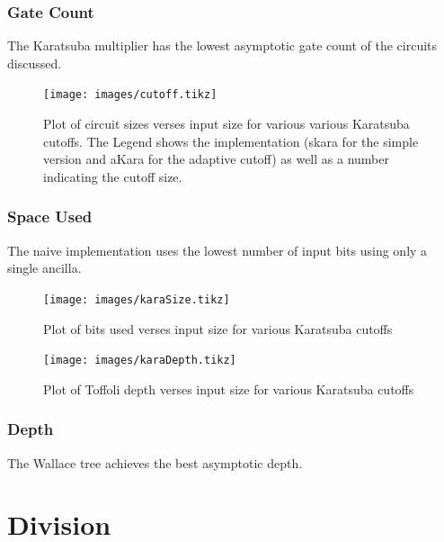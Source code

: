     \subsubsection{Gate Count}
      The Karatsuba multiplier has the lowest asymptotic gate count of the circuits discussed.
     \begin{figure}
        \capstart
        \texttt{[image: images/cutoff.tikz]}
        \caption{Plot of circuit sizes verses input size for various various Karatsuba cutoffs.
                 The Legend shows the implementation (skara for the simple version and aKara for the adaptive cutoff) as well as a number indicating the cutoff size. }
        \label{fig:cutoff}
      \end{figure}


    \subsubsection{Space Used}
      The naive implementation uses the lowest number of input bits using only a single ancilla.
      \begin{figure}
        \capstart
        \texttt{[image: images/karaSize.tikz]}
        \caption{Plot of bits used verses input size for various Karatsuba cutoffs}
        \label{fig:size}
      \end{figure}
      \begin{figure}
        \capstart
        \texttt{[image: images/karaDepth.tikz]}
        \caption{Plot of Toffoli depth verses input size for various Karatsuba cutoffs}
        \label{fig:depth}
      \end{figure}

    \subsubsection{Depth}
      The Wallace tree achieves the best asymptotic depth.

\section{Division}
